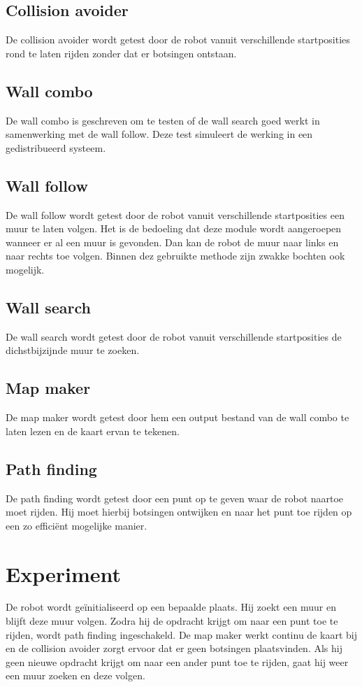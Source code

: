 \documentclass[a4paper,10pt]{article}
\begin{document}
\subsection{Collision avoider}
De collision avoider wordt getest door de robot vanuit verschillende startposities rond te laten rijden zonder dat er botsingen ontstaan.

\subsection{Wall combo}
De wall combo is geschreven om te testen of de wall search goed werkt in samenwerking met de wall follow. Deze test simuleert
de werking in een gedistribueerd systeem.

\subsection{Wall follow}
De wall follow wordt getest door de robot vanuit verschillende startposities een muur te laten volgen. Het is de bedoeling dat deze module wordt aangeroepen wanneer er al een muur is gevonden. Dan kan de robot de muur naar links en naar rechts toe volgen. Binnen dez gebruikte methode zijn zwakke bochten ook mogelijk.

\subsection{Wall search}
De wall search wordt getest door de robot vanuit verschillende startposities de dichstbijzijnde muur te zoeken. 

\subsection{Map maker}
De map maker wordt getest door hem een output bestand van de wall combo te laten lezen en de kaart ervan te tekenen.

\subsection{Path finding}
De path finding wordt getest door een punt op te geven waar de robot naartoe moet rijden. Hij moet hierbij botsingen ontwijken en naar het punt toe rijden op een zo effici\"{e}nt mogelijke manier.

\section{Experiment}
De robot wordt ge\"{i}nitialiseerd op een bepaalde plaats. Hij zoekt een muur en blijft deze muur volgen. Zodra hij de opdracht krijgt om naar een punt toe te rijden, wordt path finding ingeschakeld. De map maker werkt continu de kaart bij en de collision avoider zorgt ervoor dat er geen botsingen plaatsvinden. Als hij geen nieuwe opdracht krijgt om naar een ander punt toe te rijden, gaat hij weer een muur zoeken en deze volgen.
\end{document}
